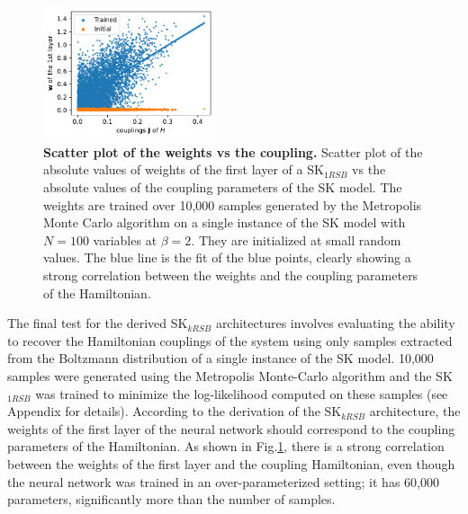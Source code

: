 \documentclass[aps,physrev,10pt,floatfix,reprint]{revtex4-2}
\begin{document}
\begin{figure}[h]
    \centering 
    \includegraphics[width=0.45\textwidth]{img/MC_img.pdf}
    \caption{\textbf{Scatter plot of the weights vs the coupling.} Scatter plot of the absolute values of weights of the first layer of a SK$_{1RSB}$ vs the absolute values of the coupling parameters of the SK model. The weights are trained over 10,000 samples generated by the Metropolis Monte Carlo algorithm on a single instance of the SK model with $N=100$ variables at $\beta=2$. They are initialized at small random values. The blue line is the fit of the blue points, clearly showing a strong correlation between the weights and the coupling parameters of the Hamiltonian.}
    \label{fig:SK_MC}
\end{figure}

The final test for the derived SK$_{kRSB}$ architectures involves evaluating the ability to recover the Hamiltonian couplings of the system using only samples extracted from the Boltzmann distribution of a single instance of the SK model. 10,000 samples were generated using the Metropolis Monte-Carlo algorithm and the SK$_{1RSB}$ was trained to minimize the log-likelihood computed on these samples (see Appendix for details). According to the derivation of the SK$_{kRSB}$ architecture, the weights of the first layer of the neural network should correspond to the coupling parameters of the Hamiltonian. As shown in Fig.\ref{fig:SK_MC}, there is a strong correlation between the weights of the first layer and the coupling Hamiltonian, even though the neural network was trained in an over-parameterized setting; it has 60,000 parameters, significantly more than the number of samples.
\end{document}
